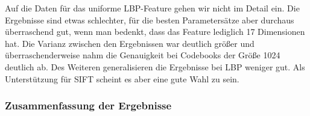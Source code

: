 Auf die Daten für das uniforme LBP-Feature gehen wir nicht im Detail ein. Die Ergebnisse sind etwas schlechter, für die besten Parametersätze aber durchaus überraschend gut, wenn man bedenkt, dass das Feature lediglich 17 Dimensionen hat. Die Varianz zwischen den Ergebnissen war deutlich größer und überraschenderweise nahm die Genauigkeit bei Codebooks der Größe 1024 deutlich ab. Des Weiteren generalisieren die Ergebnisse bei LBP weniger gut. Als Unterstützung für SIFT scheint es aber eine gute Wahl zu sein.



\subsubsection{Zusammenfassung der Ergebnisse}
